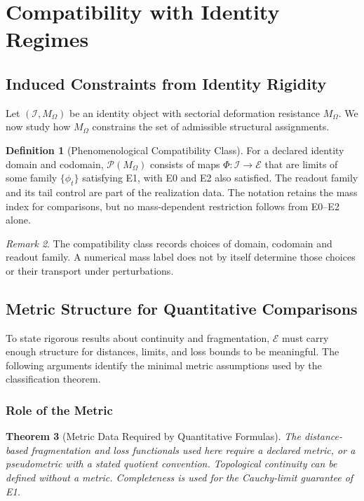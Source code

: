 \documentclass[11pt,a4paper]{article}
\theoremstyle{plain}
\newtheorem{theorem}{Theorem}[section]
\theoremstyle{definition}
\newtheorem{definition}[theorem]{Definition}
\theoremstyle{remark}
\newtheorem{remark}[theorem]{Remark}
\begin{document}
\section{Compatibility with Identity Regimes}

\subsection{Induced Constraints from Identity Rigidity}

Let $(\mathcal{I}, M_\Omega)$ be an identity object with sectorial deformation resistance $M_\Omega$. We now study how $M_\Omega$ constrains the set of admissible structural assignments.

\begin{definition}[Phenomenological Compatibility Class]\label{def:compat-class}
For a declared identity domain and codomain, $\mathcal P(M_\Omega)$ consists of maps $\Phi:\mathcal I\to\mathcal E$ that are limits of some family $\{\phi_t\}$ satisfying E1, with E0 and E2 also satisfied. The readout family and its tail control are part of the realization data. The notation retains the mass index for comparisons, but no mass-dependent restriction follows from E0--E2 alone.
\end{definition}

\begin{remark}
The compatibility class records choices of domain, codomain and readout family. A numerical mass label does not by itself determine those choices or their transport under perturbations.
\end{remark}

\subsection{Metric Structure for Quantitative Comparisons}

To state rigorous results about continuity and fragmentation, $\mathcal{E}$ must carry enough structure for distances, limits, and loss bounds to be meaningful. The following arguments identify the minimal metric assumptions used by the classification theorem.



\subsubsection{Role of the Metric}

\begin{theorem}[Metric Data Required by Quantitative Formulas]\label{thm:h3-necessary}
The distance-based fragmentation and loss functionals used here require a declared metric, or a pseudometric with a stated quotient convention. Topological continuity can be defined without a metric. Completeness is used for the Cauchy-limit guarantee of E1.
\end{theorem}
\end{document}
